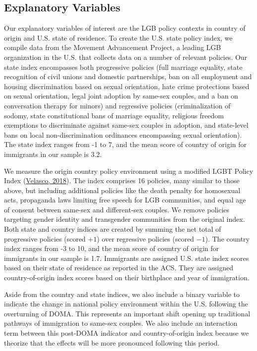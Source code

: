 \documentclass[
  11pt,
]{article}
\begin{document}
\hypertarget{explanatory-variables}{%
\subsection{Explanatory Variables}\label{explanatory-variables}}

Our explanatory variables of interest are the LGB policy contexts in country of origin and U.S. state of residence. To create the U.S. state policy index, we compile data from the Movement Advancement Project, a leading LGB organization in the U.S. that collects data on a number of relevant policies. Our state index encompasses both progressive policies (full marriage equality, state recognition of civil unions and domestic partnerships, ban on all employment and housing discrimination based on sexual orientation, hate crime protections based on sexual orientation, legal joint adoption by same-sex couples, and a ban on conversation therapy for minors) and regressive policies (criminalization of sodomy, state constitutional bans of marriage equality, religious freedom exemptions to discriminate against same-sex couples in adoption, and state-level bans on local non-discrimination ordinances encompassing sexual orientation). The state index ranges from -1 to 7, and the mean score of country of origin for immigrants in our sample is 3.2.

We measure the origin country policy environment using a modified LGBT Policy Index (\protect\hyperlink{ref-velasco_2018}{Velasco, 2018}). The index comprises 16 policies, many similar to those above, but including additional policies like the death penalty for homosexual acts, propaganda laws limiting free speech for LGB communities, and equal age of consent between same-sex and different-sex couples. We remove policies targeting gender identity and transgender communities from the original index. Both state and country indices are created by summing the net total of progressive policies (scored \(+1\)) over regressive policies (scored \(-1\)). The country index ranges from -3 to 10, and the mean score of country of origin for immigrants in our sample is 1.7.
Immigrants are assigned U.S. state index scores based on their state of residence as reported in the ACS. They are assigned country-of-origin index scores based on their birthplace and year of immigration.

Aside from the country and state indices, we also include a binary variable to indicate the change in national policy environment within the U.S. following the overturning of DOMA. This represents an important shift opening up traditional pathways of immigration to same-sex couples. We also include an interaction term between this post-DOMA indicator and country-of-origin index because we theorize that the effects will be more pronounced following this period.
\end{document}
